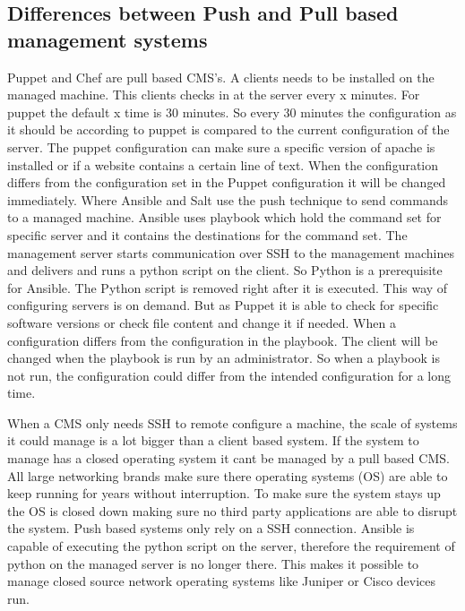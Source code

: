 \subsection{Differences between Push and Pull based management systems}\label{subsec:pushpull}
Puppet and Chef are pull based CMS's. A clients needs to be installed on the managed machine. This clients checks in at the server every x minutes. For puppet the default x time is 30 minutes. So every 30 minutes the configuration as it should be according to puppet is compared to the current configuration of the server. The puppet configuration can make sure a specific version of apache is installed or if a website contains a certain line of text. When the configuration differs from the configuration set in the Puppet configuration it will be changed immediately. Where Ansible and Salt use the push technique to send commands to a managed machine. Ansible uses playbook which hold the command set for specific server and it contains the destinations for the command set. The management server starts communication over SSH to the management machines and delivers and runs a python script on the client. So Python is a prerequisite for Ansible. The Python script is removed right after it is executed. This way of configuring servers is on demand. But as Puppet it is able to check for specific software versions or check file content and change it if needed. When a configuration differs from the configuration in the playbook. The client will be changed when the playbook is run by an administrator. So when a playbook is not run, the configuration could differ from the intended configuration for a long time. 

When a CMS only needs SSH to remote configure a machine, the scale of systems it could manage is a lot bigger than a client based system. If the system to manage has a closed operating system it cant be managed by a pull based CMS. All large networking brands make sure there operating systems (OS) are able to keep running for years without interruption. To make sure the system stays up the OS is closed down making sure no third party applications are able to disrupt the system. Push based systems only rely on a SSH connection. Ansible is capable of executing the python script on the server, therefore the requirement of python on the managed server is no longer there. This makes it possible to manage closed source network operating systems like Juniper or Cisco devices run. 

